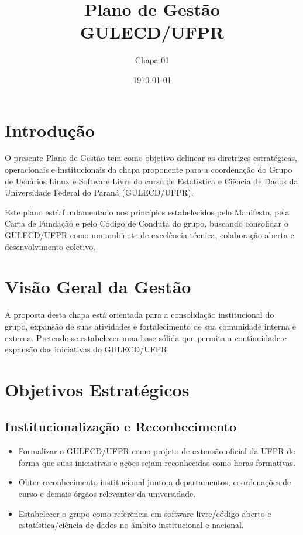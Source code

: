 \documentclass[11pt,a4paper]{article}
\title{\textbf{Plano de Gestão \\ GULECD/UFPR}}
\author{Chapa 01}
\date{\today}
\begin{document}
\maketitle

\section{Introdução}

O presente Plano de Gestão tem como objetivo delinear as diretrizes estratégicas, operacionais e institucionais da chapa proponente para a coordenação do Grupo de Usuários Linux e Software Livre do curso de Estatística e Ciência de Dados da Universidade Federal do Paraná (GULECD/UFPR).

Este plano está fundamentado nos princípios estabelecidos pelo Manifesto, pela Carta de Fundação e pelo Código de Conduta do grupo, buscando consolidar o GULECD/UFPR como um ambiente de excelência técnica, colaboração aberta e desenvolvimento coletivo.

\section{Visão Geral da Gestão}

A proposta desta chapa está orientada para a consolidação institucional do grupo, expansão de suas atividades e fortalecimento de sua comunidade interna e externa. Pretende-se estabelecer uma base sólida que permita a continuidade e expansão das iniciativas do GULECD/UFPR.

\section{Objetivos Estratégicos}

\subsection{Institucionalização e Reconhecimento}

\begin{itemize}
    \item Formalizar o GULECD/UFPR como projeto de extensão oficial da UFPR de forma que suas iniciativas e ações sejam reconhecidas como horas formativas.
    \item Obter reconhecimento institucional junto a departamentos, coordenações de curso e demais órgãos relevantes da universidade.
    \item Estabelecer o grupo como referência em software livre/código aberto e estatística/ciência de dados no âmbito institucional e nacional.
\end{itemize}
\end{document}
